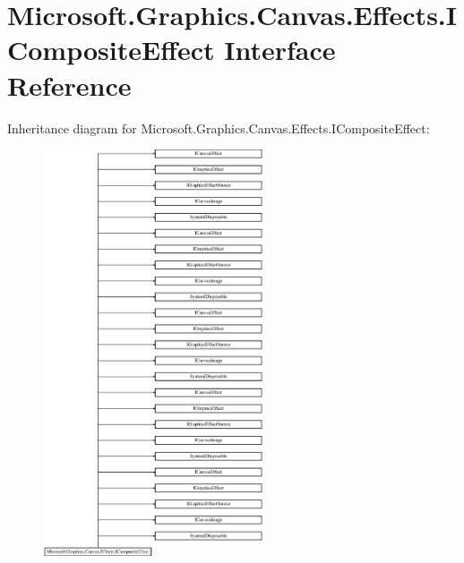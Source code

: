 \hypertarget{interface_microsoft_1_1_graphics_1_1_canvas_1_1_effects_1_1_i_composite_effect}{}\section{Microsoft.\+Graphics.\+Canvas.\+Effects.\+I\+Composite\+Effect Interface Reference}
\label{interface_microsoft_1_1_graphics_1_1_canvas_1_1_effects_1_1_i_composite_effect}
Inheritance diagram for Microsoft.\+Graphics.\+Canvas.\+Effects.\+I\+Composite\+Effect\+:\begin{figure}[H]
\begin{center}
\leavevmode
\includegraphics[height=12.000000cm]{interface_microsoft_1_1_graphics_1_1_canvas_1_1_effects_1_1_i_composite_effect}
\end{center}
\end{figure}
